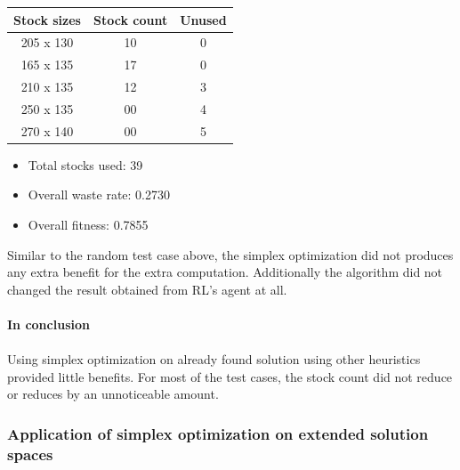 \documentclass[a4paper]{article}
\begin{document}
\begin{center}
\begin{minipage}{0.45\textwidth}
        \centering
        \begin{tabular}{|c|c|c|}
        \hline
        \rowcolor{gray!30} \textbf{Stock sizes} & \textbf{Stock count} & \textbf{Unused} \\ \hline
        205 x 130 & 10 & 0 \\ \hline
        165 x 135 & 17 & 0 \\ \hline
        210 x 135 & 12 & 3 \\ \hline
        250 x 135 & 00 & 4 \\ \hline
        270 x 140 & 00 & 5 \\ \hline
        \end{tabular}
        \centering
        \begin{itemize}
            \item Total stocks used: 39 
            \item Overall waste rate: 0.2730
            \item Overall fitness: 0.7855
        \end{itemize}
    \end{minipage}
    \end{center}
    \vspace{0.2cm}
    Similar to the random test case above, the simplex optimization did not produces any extra benefit for the extra computation. Additionally the algorithm did not changed the result obtained from RL's agent at all. 
    \\ \\
    \textbf{In conclusion}
    \\ \\
    Using simplex optimization on already found solution using other heuristics provided little benefits. For most of the test cases, the stock count did not reduce or reduces by an unnoticeable amount.

    \subsubsection{Application of simplex optimization on extended solution spaces}
    
\end{document}
